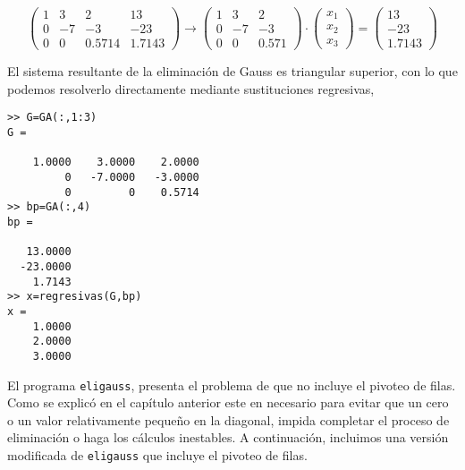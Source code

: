\begin{equation*}
\begin{pmatrix}
1&    3&    2&   13\\
0&   -7&   -3&  -23\\
0&    0&    0.5714&    1.7143
\end{pmatrix}\rightarrow \begin{pmatrix}
1&    3&    2\\
0&   -7&   -3\\
0&    0&    0.571
\end{pmatrix}\cdot \begin{pmatrix}
x_1\\
x_2\\
x_3
\end{pmatrix}=\begin{pmatrix}
13\\
-23\\
1.7143
\end{pmatrix}
\end{equation*}

El sistema resultante de la eliminación de Gauss es triangular superior, con lo que podemos resolverlo directamente mediante sustituciones regresivas,

\begin{verbatim}
>> G=GA(:,1:3)
G =

    1.0000    3.0000    2.0000
         0   -7.0000   -3.0000
         0         0    0.5714
>> bp=GA(:,4)
bp =

   13.0000
  -23.0000
    1.7143
>> x=regresivas(G,bp)
x =
    1.0000
    2.0000
    3.0000
\end{verbatim}

El programa \texttt{eligauss}, presenta el problema de que no incluye el pivoteo de filas. Como se explicó en el capítulo anterior este en necesario para evitar que un cero o un valor relativamente pequeño en la diagonal, impida completar el proceso de eliminación o haga los cálculos inestables. A continuación, incluimos una versión modificada de \texttt{eligauss} que incluye el pivoteo de filas.

